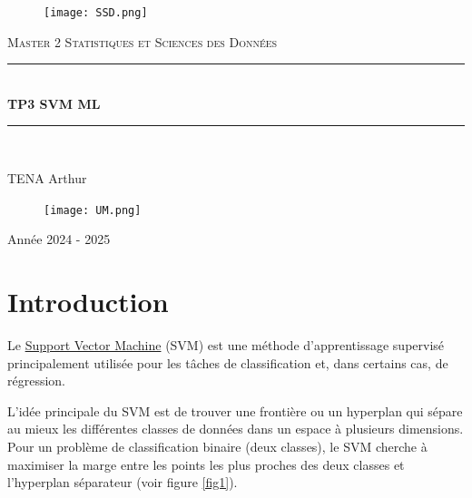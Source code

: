 \documentclass{article}
\author{TENA Arthur}
\date{ }
\begin{document}
\begin{titlepage}

\newcommand{\HRule}{\rule{\linewidth}{0.5mm}}
\center 


\begin{figure}
    \centering
    \texttt{[image: SSD.png]}
\end{figure}



\textsc{\Large Master 2 Statistiques et Sciences des Données }\\[1cm] %
\HRule \\[0.4cm]
{ \huge \bfseries TP3 SVM ML }\\[0.4cm]
\HRule \\[1.5cm]
\begin{center}
\begin{Large}

TENA Arthur\\
\hspace{4cm}

\end{Large}
\end{center}
    


\begin{figure}[b]
    \centering
    \texttt{[image: UM.png]}
    \label{UM}
\end{figure}
\begin{Large} Année 2024 - 2025 \\
\end{Large}

\end{titlepage}
\pagebreak
\renewcommand{\contentsname}{Sommaire}
\tableofcontents
\thispagestyle{empty}
\newpage

\maketitle

\section{Introduction}
Le \underline{Support Vector Machine} (SVM) est une méthode d'apprentissage supervisé principalement utilisée pour les tâches de classification et, dans certains cas, de régression. 

L'idée principale du SVM est de trouver une frontière ou un hyperplan qui sépare au mieux les différentes classes de données dans un espace à plusieurs dimensions. Pour un problème de classification binaire (deux classes), le SVM cherche à maximiser la marge entre les points les plus proches des deux classes et l'hyperplan séparateur (voir figure \ref{fig1}).
\end{document}
